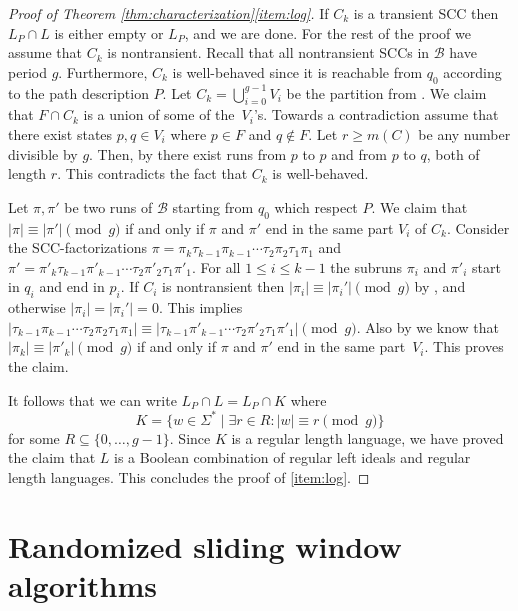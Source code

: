 \documentclass{article}\usepackage[a4paper,margin=20mm]{geometry}
\newcommand{\B}{\mathcal{B}}
\renewcommand{\geq}{\geqslant}
\renewcommand{\leq}{\leqslant}
\renewcommand{\ge}{\geq}
\renewcommand{\le}{\leq}
\begin{document}
\begin{proof}[Proof of Theorem \ref{thm:characterization}\ref{item:log}]
If $C_k$ is a transient SCC then $L_P \cap L$ is either empty or $L_P$, and we are done.
For the rest of the proof we assume that $C_k$ is nontransient. Recall that all nontransient SCCs in $\B$ have period $g$.
Furthermore, $C_k$ is well-behaved since it is reachable from $q_0$ according to the path description $P$.
Let $C_k = \bigcup_{i=0}^{g-1} V_i$ be the partition from .
We claim that $F \cap C_k$ is a union of some of the~$V_i$'s.
Towards a contradiction assume that there exist states $p,q \in V_i$ where $p \in F$ and $q \notin F$.
Let $r \ge m(C)$ be any number divisible by $g$.
Then, by  there exist runs from $p$ to $p$ and from $p$ to $q$,
both of length $r$. This contradicts the fact that $C_k$ is well-behaved.

Let $\pi, \pi'$ be two runs of $\B$ starting from $q_0$
which respect $P$.
We claim that $|\pi| \equiv |\pi'| \pmod{g}$ if and only if $\pi$ and $\pi'$ end in the same part $V_i$ of $C_k$.
Consider the SCC-factorizations
$\pi = \pi_k \tau_{k-1} \pi_{k-1} \cdots \tau_2 \pi_2 \tau_1 \pi_1$ and
$\pi' = \pi'_k \tau_{k-1} \pi'_{k-1} \cdots \tau_2 \pi'_2 \tau_1 \pi'_1$.
For all $1 \le i \le k-1$ the subruns $\pi_i$ and $\pi'_i$ start in $q_i$ and end in $p_i$.
If $C_i$ is nontransient then $|\pi_i| \equiv |\pi_i'| \pmod{g}$ by ,
and otherwise $|\pi_i| = |\pi_i'| = 0$.
This implies $|\tau_{k-1} \pi_{k-1} \cdots \tau_2 \pi_2 \tau_1 \pi_1| \equiv |\tau_{k-1} \pi'_{k-1} \cdots \tau_2 \pi'_2 \tau_1 \pi'_1| \pmod{g}$.
Also by  we know that $|\pi_k| \equiv |\pi'_k| \pmod{g}$ if and only if
$\pi$ and $\pi'$ end in the same part~$V_i$.
This proves the claim.

It follows that we can write $L_P \cap L = L_P \cap K$ where
\[ K = \{ w \in \Sigma^* \mid \exists r \in R \colon |w| \equiv r \pmod{g} \} \]
for some $R \subseteq \{0, \dots, g-1\}$.
Since $K$ is a regular length language, we have proved the claim that $L$ is a Boolean combination
of regular left ideals and regular length languages.
This concludes the proof of \ref{item:log}.
\end{proof}


\section{Randomized sliding window algorithms}

\label{chap:random}
\end{document}
